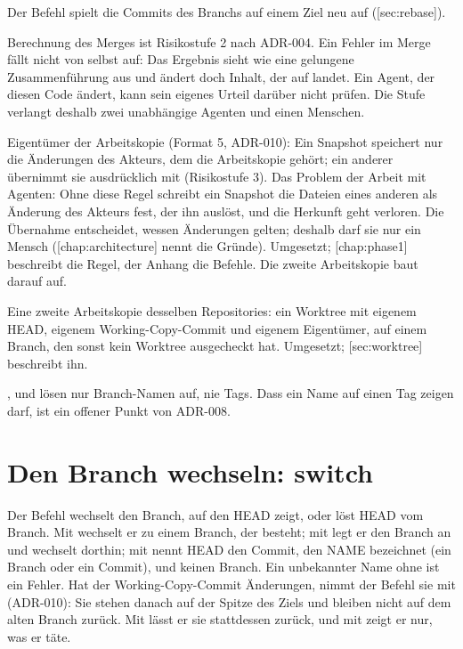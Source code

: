 \item Der Befehl  spielt die Commits des Branchs auf einem Ziel neu auf
([sec:rebase]).
\item Berechnung des Merges ist Risikostufe 2 nach ADR-004.
Ein Fehler im Merge fällt nicht von selbst auf:
Das Ergebnis sieht wie eine gelungene Zusammenführung
aus und ändert doch Inhalt, der auf  landet.
Ein Agent, der diesen Code ändert, kann sein eigenes Urteil darüber nicht prüfen.
Die Stufe verlangt deshalb zwei unabhängige Agenten und einen Menschen.
\item Eigentümer der Arbeitskopie (Format 5, ADR-010): Ein Snapshot speichert nur die
Änderungen des Akteurs, dem die Arbeitskopie gehört; ein anderer übernimmt sie ausdrücklich
mit  (Risikostufe 3).
Das Problem der Arbeit mit Agenten: Ohne diese Regel schreibt ein Snapshot die Dateien eines
anderen als Änderung des Akteurs fest, der ihn auslöst, und die Herkunft geht verloren.
Die Übernahme entscheidet, wessen Änderungen gelten; deshalb darf sie nur ein Mensch
([chap:architecture] nennt die Gründe).
Umgesetzt; [chap:phase1] beschreibt die Regel, der Anhang die Befehle.
Die zweite Arbeitskopie baut darauf auf.
\item Eine zweite Arbeitskopie desselben Repositories: ein Worktree mit eigenem HEAD, eigenem
Working-Copy-Commit und eigenem Eigentümer, auf einem Branch, den sonst kein Worktree ausgecheckt
hat. Umgesetzt; [sec:worktree] beschreibt ihn.
\item {},  und  lösen nur Branch-Namen auf, nie Tags.
Dass ein Name auf einen Tag zeigen darf, ist ein offener Punkt von ADR-008.
\stopitemize

\section{Den Branch wechseln: switch}

Der Befehl  wechselt den Branch, auf den HEAD zeigt, oder löst HEAD vom Branch.
Mit  wechselt er zu einem Branch, der besteht;
mit  legt er den Branch an und wechselt dorthin;
mit  nennt HEAD den Commit, den NAME bezeichnet (ein Branch oder ein
Commit), und keinen Branch.
Ein unbekannter Name ohne  ist ein Fehler.
Hat der Working-Copy-Commit Änderungen, nimmt der Befehl sie mit (ADR-010):
Sie stehen danach auf der Spitze des Ziels und bleiben nicht auf dem alten Branch zurück.
Mit  lässt er sie stattdessen zurück, und mit  zeigt er nur,
was er täte.

